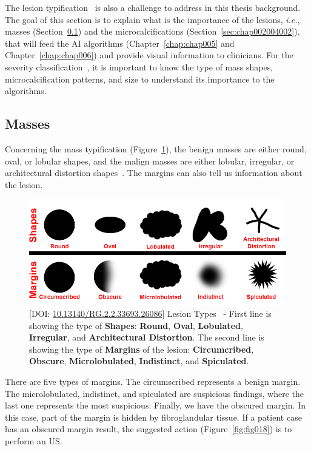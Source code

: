 The lesion typification~\cite{doi:10.1148/radiol.2018181371} is also a challenge to address in this thesis background.
The goal of this section is to explain what is the importance of the lesions, {\it i.e.}, masses (Section~\ref{sec:chap002004001}) and the microcalcifications (Section~\ref{sec:chap002004002}), that will feed the \ac{AI} algorithms (Chapter~\ref{chap:chap005} and Chapter~\ref{chap:chap006}) and provide visual information to clinicians.
For the severity classification~\cite{8611096, 9231684}, it is important to know the type of mass shapes, microcalcification patterns, and size to understand its importance to the algorithms.

\subsection{Masses}
\label{sec:chap002004001}

Concerning the mass typification (Figure~\ref{fig:fig021}), the benign masses are either round, oval, or lobular shapes, and the malign masses are either lobular, irregular, or architectural distortion shapes~\cite{nadia2020xai}.
The margins can also tell us information about the lesion.

\begin{figure}[htbp]
\centering
\includegraphics[width=\columnwidth]{images/fig021}
\caption{[DOI: \href{https://doi.org/10.13140/RG.2.2.33693.26086}{10.13140/RG.2.2.33693.26086}] Lesion Types~\cite{nadia2020maivelt} - First line is showing the type of {\bf Shapes}: {\bf Round}, {\bf Oval}, {\bf Lobulated}, {\bf Irregular}, and {\bf Architectural Distortion}. The second line is showing the type of {\bf Margins} of the lesion: {\bf Circumcribed}, {\bf Obscure}, {\bf Microlobulated}, {\bf Indistinct}, and {\bf Spiculated}.}
\label{fig:fig021}
\end{figure}

There are five types of margins.
The circumscribed represents a benign margin.
The microlobulated, indistinct, and spiculated are suspicious findings, where the last one represents the most suspicious.
Finally, we have the obscured margin.
In this case, part of the margin is hidden by fibroglandular tissue.
If a patient case has an obscured margin result, the suggested action (Figure~\ref{fig:fig018}) is to perform an \ac{US}.


